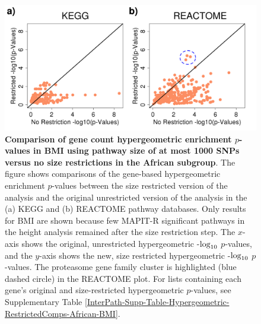 \documentclass[10pt,a4paper]{article}
\def\log{{\rm log}}
\begin{document}
\begin{figure}[htb]
\centering
\includegraphics[scale=.4]{Images/Main/InterPath_Main_Figure_Hypergeometric_RestrictedComps_African_BMI_vs4.png}
\caption[TBD]{\textbf{Comparison of gene count hypergeometric enrichment $p$-values in BMI using pathway size of at most 1000 SNPs versus no size restrictions in the African subgroup}. The figure shows comparisons of the gene-based hypergeometric enrichment $p$-values between the size restricted version of the analysis and the original unrestricted version of the analysis in the (a) KEGG and (b) REACTOME pathway databases. Only results for BMI are shown because few MAPIT-R significant pathways in the height analysis remained after the size restriction step. The $x$-axis shows the original, unrestricted hypergeometric -$\log_{10}$ $p$-values, and the $y$-axis shows the new, size restricted hypergeometric -$\log_{10}$ $p$-values. The proteasome gene family cluster is highlighted (blue dashed circle) in the REACTOME plot. For lists containing each gene's original and  size-restricted hypergeometric $p$-values, see Supplementary Table \ref{InterPath-Supp-Table-Hypergeometric-RestrictedComps-African-BMI}.}
\label{InterPath-Main-Figure-Hypergeometric-RestrictedComps-African-BMI}
\end{figure}
\end{document}

